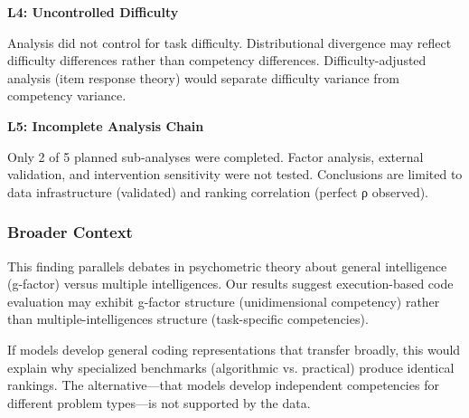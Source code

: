 \textbf{L4: Uncontrolled Difficulty}

Analysis did not control for task difficulty. Distributional divergence may reflect difficulty differences rather than competency differences. Difficulty-adjusted analysis (item response theory) would separate difficulty variance from competency variance.

\textbf{L5: Incomplete Analysis Chain}

Only 2 of 5 planned sub-analyses were completed. Factor analysis, external validation, and intervention sensitivity were not tested. Conclusions are limited to data infrastructure (validated) and ranking correlation (perfect ρ observed).

\subsubsection{Broader Context}

This finding parallels debates in psychometric theory about general intelligence (g-factor) versus multiple intelligences. Our results suggest execution-based code evaluation may exhibit g-factor structure (unidimensional competency) rather than multiple-intelligences structure (task-specific competencies).

If models develop general coding representations that transfer broadly, this would explain why specialized benchmarks (algorithmic vs. practical) produce identical rankings. The alternative—that models develop independent competencies for different problem types—is not supported by the data.
